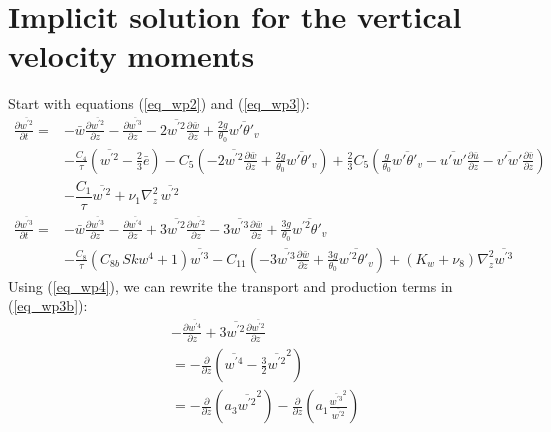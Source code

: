 \documentclass[11pt,fleqn]{article}
\newcommand{\ptlder}[2]{\frac{\partial #1}{\partial #2}}
\begin{document}
\section{Implicit solution for the vertical velocity moments}

Start with equations (\ref{eq_wp2}) and (\ref{eq_wp3}):
%
\begin{equation}
\label{eq_wp2b}
\begin{split}
\ptlder{\overline{w^{'2}}}{t} 
=& - \bar{w}\ptlder{\overline{w^{'2}}}{z}	 
   - \ptlder{\overline{w^{'3}}}{z} 
   - 2\overline{w^{'2}}\ptlder{\bar{w}}{z}
   + \frac{2g}{\theta_0} \overline{w'\theta'_v} \\
 & - \frac{C_4}{\tau} \left( \overline{w^{'2}} -\frac{2}{3}\bar{e} \right)
   - C_5 
     \left(
       - 2\overline{w^{'2}}\ptlder{\bar{w}}{z}
       + \frac{2g}{\theta_0} \overline{w'\theta'_v}
     \right)
   + \frac{2}{3} C_5
     \left(
       \frac{g}{\theta_0} \overline{w'\theta'_v} 
       - \overline{u'w'}\ptlder{\bar{u}}{z} 
       - \overline{v'w'}\ptlder{\bar{v}}{z} 
     \right) \\
 & - \dfrac{C_1}{\tau} \overline{w^{'2}} 
   + \nu_1 \nabla_z^2 \, \overline{w^{'2}}
\end{split}
\end{equation}
%
\begin{equation}
\label{eq_wp3b}
\begin{split}
\ptlder{\overline{w^{'3}}}{t}
= & - \bar{w}\ptlder{\overline{w^{'3}}}{z}
    - \ptlder{\overline{w^{'4}}}{z} 
    + 3\overline{w^{'2}}\ptlder{\overline{w^{'2}}}{z}
    - 3\overline{w^{'3}}\ptlder{\bar{w}}{z}
    + \frac{3g}{\theta_0} \overline{w^{'2}\theta'_v} \\
  & - \frac{C_8}{\tau}\left( C_{8b} \, Skw^4 + 1 \right) \overline{w^{'3}}
    - C_{11} \left(
                - 3 \overline{w^{'3}}\ptlder{\bar{w}}{z}
                + \frac{3g}{\theta_0} \overline{w^{'2}\theta'_v}
             \right)
    + \left( K_w + \nu_8 \right) \nabla_z^2 \overline{w^{'3}}
\end{split}
\end{equation}
%
Using (\ref{eq_wp4}), we can rewrite the transport and production terms
in (\ref{eq_wp3b}):
%
\begin{equation}
\begin{split}
& - \ptlder{\overline{w^{'4}}}{z} 
  + 3\overline{w^{'2}}\ptlder{\overline{w^{'2}}}{z} \\
& = - \ptlder{}{z}
         \left( \overline{w^{'4}} -\frac{3}{2}\overline{w^{'2}}^2 \right) \\
& = - \ptlder{}{z} 
      \left( a_3 \overline{w^{'2}}^2 \right)
    - \ptlder{}{z} 
      \left( a_1 \frac{ \overline{w^{'3}}^2 }{ \overline{w^{'2}} } \right)
\end{split}
\end{equation}
\end{document}
